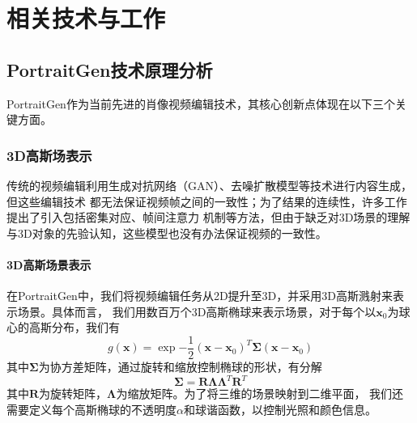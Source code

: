 
\chapter{相关技术与工作}

\section{PortraitGen技术原理分析}

PortraitGen作为当前先进的肖像视频编辑技术，其核心创新点体现在以下三个关键方面。

\subsection{3D高斯场表示}

传统的视频编辑利用生成对抗网络（GAN）、去噪扩散模型等技术进行内容生成，但这些编辑技术
都无法保证视频帧之间的一致性；为了结果的连续性，许多工作提出了引入包括密集对应、帧间注意力
机制等方法，但由于缺乏对3D场景的理解与3D对象的先验认知，这些模型也没有办法保证视频的一致性。

\subsubsection{3D高斯场景表示}
在PortraitGen中，我们将视频编辑任务从2D提升至3D，并采用3D高斯溅射来表示场景。具体而言，
我们用数百万个3D高斯椭球来表示场景，对于每个以$\symbf{x}_0$为球心的高斯分布，我们有
\begin{equation}
    g(\symbf{x})=\exp{-\frac{1}{2}(\symbf{x}-\symbf{x}_0)^T\symbf{\Sigma}(\symbf{x}-\symbf{x}_0)}
\end{equation}
其中$\symbf{\Sigma}$为协方差矩阵，通过旋转和缩放控制椭球的形状，有分解
\begin{equation}
    \symbf{\Sigma}=\symbf{R}\symbf{\Lambda}\symbf{\Lambda}^T\symbf{R}^T
    \label{cov-decom}
\end{equation}
其中$\symbf{R}$为旋转矩阵，$\symbf{\Lambda}$为缩放矩阵。为了将三维的场景映射到二维平面，
我们还需要定义每个高斯椭球的不透明度$\alpha$和球谐函数，以控制光照和颜色信息。

